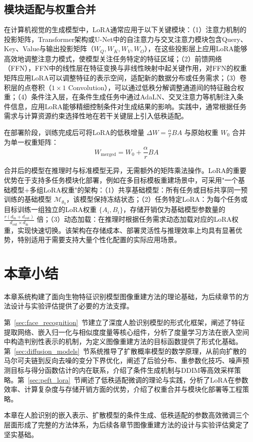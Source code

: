 \subsection{模块适配与权重合并}

在计算机视觉的生成模型中，LoRA通常应用于以下关键模块：（1）注意力机制的投影矩阵，Transformer架构或U-Net中的自注意力与交叉注意力模块包含Query、Key、Value与输出投影矩阵（$W_Q, W_K, W_V, W_O$），在这些投影层上应用LoRA能够高效地调整注意力模式，使模型关注任务特定的特征区域；（2）前馈网络（FFN），FFN中的线性层在特征变换与非线性映射中起关键作用，对FFN的权重矩阵应用LoRA可以调整特征的表示空间，适配新的数据分布或任务需求；（3）卷积层的点卷积（$1\times1$ Convolution），可以通过低秩分解调整通道间的特征融合权重；（4）条件注入层，在条件生成任务中通过AdaLN、交叉注意力等机制注入条件信息，应用LoRA能够精细控制条件对生成结果的影响。实践中，通常根据任务需求与计算资源约束选择性地在若干关键层上引入低秩适配。

在部署阶段，训练完成后可将LoRA的低秩增量 $\Delta W = \frac{\alpha}{r}BA$ 与原始权重 $W_0$ 合并为单一权重矩阵：
\begin{equation}\label{eq:lora_merge}
      W_{\text{merged}} = W_0 + \frac{\alpha}{r}BA
\end{equation}

合并后的模型在推理时与标准模型无异，无需额外的矩阵乘法操作。LoRA的重要优势在于支持多任务模块化部署，例如在多目标模板重建场景中，可采用"一个基础模型+多组LoRA权重"的架构：（1）共享基础模型：所有任务或目标共享同一预训练的基础模型 $\mathcal{M}_{\theta_0}$，该模型保持冻结状态；（2）任务特定LoRA：为每个任务或目标训练一组独立的LoRA权重 $\{A_i, B_i\}$，存储开销仅为基础模型参数量的 $\frac{r(d_{\text{in}}+d_{\text{out}})}{d_{\text{out}}\times d_{\text{in}}}$ 倍；（3）动态加载：在推理时根据任务需求动态加载对应的LoRA权重，实现快速切换。该架构在存储成本、部署灵活性与推理效率上均具有显著优势，特别适用于需要支持大量个性化配置的实际应用场景。

\section{本章小结}

本章系统构建了面向生物特征识别模型图像重建方法的理论基础，为后续章节的方法设计与实验评估提供了必要的方法支撑。

第~\ref{sec:face_recognition}~节建立了深度人脸识别模型的形式化框架，阐述了特征提取网络、嵌入归一化与相似度度量等核心组件，分析了度量学习方法在嵌入空间中构造判别性表示的机制，为定义图像重建方法的目标函数提供了形式化基础。第~\ref{sec:diffusion_models}~节系统推导了扩散概率模型的数学原理，从前向扩散的马尔可夫链到反向去噪的变分下界优化，阐述了后验分布、重参数化技巧、噪声预测目标与得分函数估计的内在联系，介绍了条件生成机制与DDIM等高效采样策略。第~\ref{sec:peft_lora}~节阐述了低秩适配微调的理论与实践，分析了LoRA在参数效率、计算复杂度与存储开销方面的优势，介绍了权重合并与模块化部署等工程策略。

本章在人脸识别的嵌入表示、扩散模型的条件生成、低秩适配的参数高效微调三个层面形成了完整的方法体系，为后续各章节图像重建方法的设计与实验评估奠定了坚实基础。


